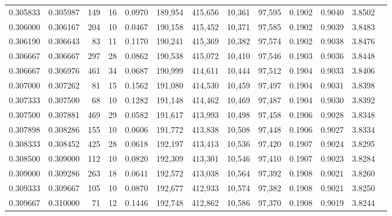 \begin{tabular}{rrrrrrrrrrrrr}
0.305833 & 0.305987 &   149 &  16 &                                     0.0970 & 189,954 & 415,656 &  10,361 &  97,595 & 0.1902 & 0.9040 & 3.8502 \\
0.306000 & 0.306167 &   204 &  10 &                                     0.0467 & 190,158 & 415,452 &  10,371 &  97,585 & 0.1902 & 0.9039 & 3.8483 \\
0.306190 & 0.306643 &    83 &  11 &                                     0.1170 & 190,241 & 415,369 &  10,382 &  97,574 & 0.1902 & 0.9038 & 3.8476 \\
0.306667 & 0.306667 &   297 &  28 &                                     0.0862 & 190,538 & 415,072 &  10,410 &  97,546 & 0.1903 & 0.9036 & 3.8448 \\
0.306667 & 0.306976 &   461 &  34 &                                     0.0687 & 190,999 & 414,611 &  10,444 &  97,512 & 0.1904 & 0.9033 & 3.8406 \\
0.307000 & 0.307262 &    81 &  15 &                                     0.1562 & 191,080 & 414,530 &  10,459 &  97,497 & 0.1904 & 0.9031 & 3.8398 \\
0.307333 & 0.307500 &    68 &  10 &                                     0.1282 & 191,148 & 414,462 &  10,469 &  97,487 & 0.1904 & 0.9030 & 3.8392 \\
0.307500 & 0.307881 &   469 &  29 &                                     0.0582 & 191,617 & 413,993 &  10,498 &  97,458 & 0.1906 & 0.9028 & 3.8348 \\
0.307898 & 0.308286 &   155 &  10 &                                     0.0606 & 191,772 & 413,838 &  10,508 &  97,448 & 0.1906 & 0.9027 & 3.8334 \\
0.308333 & 0.308452 &   425 &  28 &                                     0.0618 & 192,197 & 413,413 &  10,536 &  97,420 & 0.1907 & 0.9024 & 3.8295 \\
0.308500 & 0.309000 &   112 &  10 &                                     0.0820 & 192,309 & 413,301 &  10,546 &  97,410 & 0.1907 & 0.9023 & 3.8284 \\
0.309000 & 0.309286 &   263 &  18 &                                     0.0641 & 192,572 & 413,038 &  10,564 &  97,392 & 0.1908 & 0.9021 & 3.8260 \\
0.309333 & 0.309667 &   105 &  10 &                                     0.0870 & 192,677 & 412,933 &  10,574 &  97,382 & 0.1908 & 0.9021 & 3.8250 \\
0.309667 & 0.310000 &    71 &  12 &                                     0.1446 & 192,748 & 412,862 &  10,586 &  97,370 & 0.1908 & 0.9019 & 3.8244 \\

\end{tabular}
